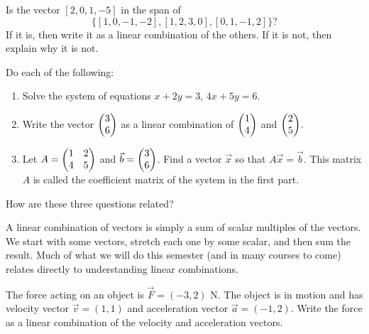 {%
\begin{problem}
 Is the vector $[2, 0, 1, -5]$ in the span of $$\{[1, 0, -1, -2], [1, 2, 3, 0], [0, 1, -1, 2]\}?$$ If it is, then write it as a linear combination of the others.  If it is not, then explain why it is not.
\end{problem}



\begin{problem}
Do each of the following:
\begin{enumerate}
 \item Solve the system of equations $x+2y=3$, $4x+5y=6$.
 \item Write the vector $\begin{pmatrix} 3\\6 \end{pmatrix}$ as a linear combination of $\begin{pmatrix} 1\\4 \end{pmatrix}$ and $\begin{pmatrix} 2\\5 \end{pmatrix}$.
 \item Let $A = \begin{pmatrix} 1&2\\4&5 \end{pmatrix}$ and $\vec b=\begin{pmatrix} 3\\6 \end{pmatrix}$.  Find a vector $\vec x$ so that $A\vec x = \vec b$. This matrix $A$ is called the coefficient matrix of the system in the first part.  
\end{enumerate}
How are these three questions related?
 
\end{problem}



A linear combination of vectors is simply a sum of scalar multiples of the vectors. 
We start with some vectors, stretch each one by some scalar, and then sum the result. 
Much of what we will do this semester (and in many courses to come) relates directly to understanding linear combinations.  

\begin{problem}
 The force acting on an object is $\vec F = (-3,2)$ N. The object is in motion and has velocity vector $\vec v=(1,1)$ and acceleration vector $\vec a = (-1,2)$.  Write the force as a linear combination of the velocity and acceleration vectors. 
\end{problem}

}
